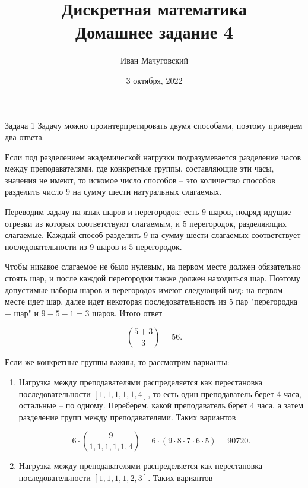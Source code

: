 \documentclass{article}
\date{3 октября, 2022}
\title{Дискретная математика \\ \Large Домашнее задание 4}
\author{Иван Мачуговский}
\begin{document}
	\maketitle

	\begin{section}{Задача 1}
		Задачу можно проинтерпретировать двумя способами, поэтому приведем два ответа.

		Если под разделением академической нагрузки подразумевается разделение часов между преподавателями, где конкретные группы, составляющие эти часы, значения не имеют, то искомое число способов -- это количество способов разделить число $9$ на сумму шести натуральных слагаемых.

		Переводим задачу на язык шаров и перегородок: есть $9$ шаров, подряд идущие отрезки из которых соответствуют слагаемым, и $5$ перегородок, разделяющих слагаемые. Каждый способ разделить $9$ на сумму шести слагаемых соответствует последовательности из $9$ шаров и $5$ перегородок.

		Чтобы никакое слагаемое не было нулевым, на первом месте должен обязательно стоять шар, и после каждой перегородки также должен находиться шар. Поэтому допустимые наборы шаров и перегородок имеют следующий вид: на первом месте идет шар, далее идет некоторая последовательность из $5$ пар "перегородка + шар" и $9 - 5 - 1 = 3$ шаров. Итого ответ

		\begin{equation*}
			\binom{5 + 3}{3} = 56.
		\end{equation*}

		Если же конкретные группы важны, то рассмотрим варианты:

		\begin{enumerate}
			\item Нагрузка между преподавателями распределяется как перестановка последовательности $[1, 1, 1, 1, 1, 4]$, то есть один преподаватель берет 4 часа, остальные -- по одному. Переберем, какой преподаватель берет $4$ часа, а затем разделение групп между преподавателями. Таких вариантов

			\begin{equation*}
				6 \cdot \binom{9}{1,1,1,1,1,4} = 6 \cdot (9 \cdot 8 \cdot 7 \cdot 6 \cdot 5) = 90720.
			\end{equation*}

			\item Нагрузка между преподавателями распределяется как перестановка последовательности $[1, 1, 1, 1, 2, 3]$. Таких вариантов


\end{enumerate}
\end{section}
\end{document}
